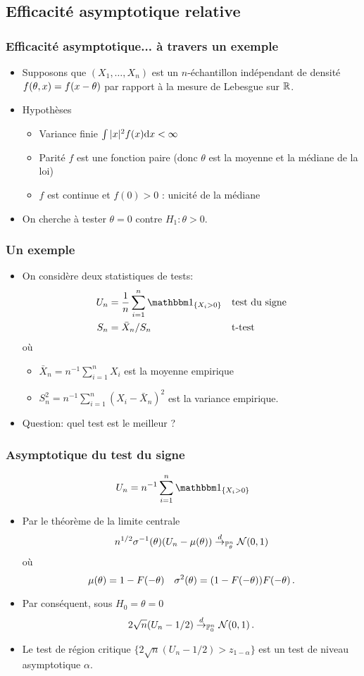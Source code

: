 \subsection{Efficacité asymptotique relative}
\begin{frame}
\frametitle{Efficacité asymptotique... à travers un exemple}
\begin{itemize}
\item Supposons que $(X_1,\dots,X_n)$ est un $n$-échantillon indépendant de densité $f(\theta,x)= f(x-\theta)$ par rapport à la mesure de Lebesgue sur $\mathbb{R}$.
\item \alert{Hypothèses}
\begin{itemize}
\item Variance finie  $\int |x|^2 f(x) \mathrm{d} x < \infty$
\item Parité  $f$ est une fonction paire (donc $\theta$ est la moyenne et la médiane de la loi)
\item $f$ est continue et $f(0) > 0$ : unicité de la médiane
\end{itemize}
\item On cherche à tester $\theta= 0$ contre $H_1: \theta > 0$.
\end{itemize}
\end{frame}


\begin{frame}
\frametitle{Un exemple}
\begin{itemize}
\item On considère deux statistiques de tests:
\begin{align*}
U_n&= \frac{1}{n} \sum_{i=1}^n \indi{X_i > 0} &&\text{test du signe} \\
S_n&= \bar{X}_n/S_n     &&\text{t-test}
\end{align*}
où \begin{itemize}
\item $\bar{X}_n= n^{-1} \sum_{i=1}^n X_i$ est la \alert{moyenne empirique}
\item $S_n^2= n^{-1} \sum_{i=1}^n (X_i - \bar{X}_n)^2$ est la \alert{variance empirique}.
\end{itemize}
\item \alert{Question:} quel test est le meilleur ?
\end{itemize}
\end{frame}

\begin{frame}
\frametitle{Asymptotique du test du signe}
$$
U_n= n^{-1} \sum_{i=1}^n \indi{X_i > 0}
$$
\begin{itemize}
\item Par le théorème de la limite centrale
$$
n^{1/2} \sigma^{-1}(\theta) (U_n - \mu(\theta)) \stackrel{d}{\rightarrow}_{\operatorname{{\mathbb P}}^n_\theta} \mathcal{N}(0,1)
$$
où
\[
\mu(\theta) = 1 - F(-\theta) \quad \sigma^2(\theta) = (1-F(-\theta)) F(-\theta) \,.
\]
\item Par conséquent, sous $H_0= \theta = 0$
\[
2 \sqrt{n} (U_n - 1/2) \stackrel{d}{\rightarrow}_{\operatorname{{\mathbb P}}^n_0} \mathcal{N}(0,1) \,.
\]
\item Le test de région critique  $\{ 2 \sqrt{n} (U_n -1/2) > z_{ 1-\alpha} \}$ est un test de niveau asymptotique $\alpha$.
\end{itemize}
\end{frame}

